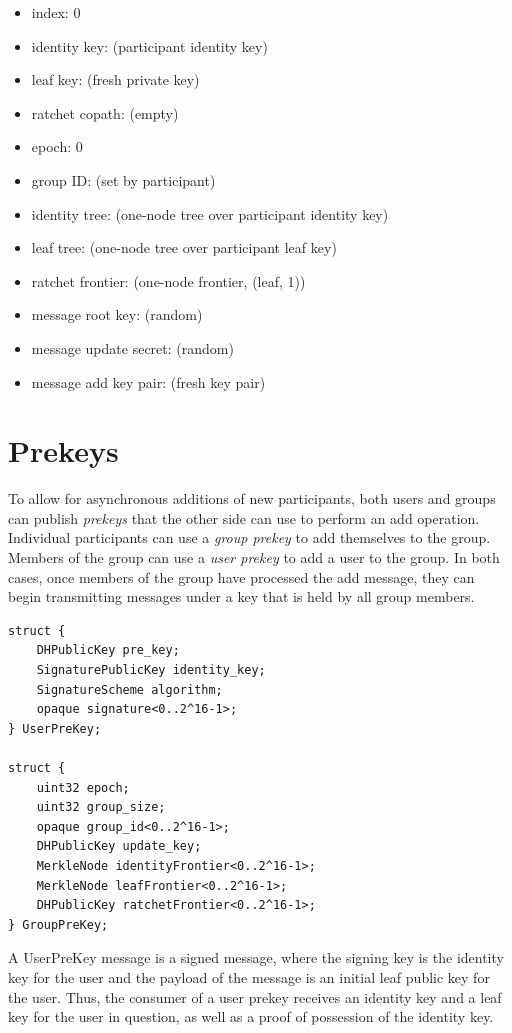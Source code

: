 \documentclass[11pt, oneside]{article}
\begin{document}
\begin{itemize}
\item{index: 0}
\item{identity key: (participant identity key)}
\item{leaf key: (fresh private key)}
\item{ratchet copath: (empty)}
\item{epoch: 0}
\item{group ID: (set by participant)}
\item{identity tree: (one-node tree over participant identity key)}
\item{leaf tree: (one-node tree over participant leaf key)}
\item{ratchet frontier: (one-node frontier, (leaf, 1))}
\item{message root key: (random)}
\item{message update secret: (random)}
\item{message add key pair: (fresh key pair)}
\end{itemize}


\section{Prekeys}

To allow for asynchronous additions of new participants, both users and groups can publish \emph{prekeys} that the other side can use to perform an add operation.  Individual participants can use a \emph{group prekey} to add themselves to the group.  Members of the group can use a \emph{user prekey} to add a user to the group.  In both cases, once members of the group have processed the add message, they can begin transmitting messages under a key that is held by all group members.

\begin{verbatim}
struct {
    DHPublicKey pre_key;
    SignaturePublicKey identity_key;
    SignatureScheme algorithm;
    opaque signature<0..2^16-1>;
} UserPreKey;

struct {
    uint32 epoch;
    uint32 group_size;
    opaque group_id<0..2^16-1>;
    DHPublicKey update_key;
    MerkleNode identityFrontier<0..2^16-1>;
    MerkleNode leafFrontier<0..2^16-1>;
    DHPublicKey ratchetFrontier<0..2^16-1>;
} GroupPreKey;
\end{verbatim}

A UserPreKey message is a signed message, where the signing key is the identity key for the user and the payload of the message is an initial leaf public key for the user.  Thus, the consumer of a user prekey receives an identity key and a leaf key for the user in question, as well as a proof of possession of the identity key.
\end{document}
